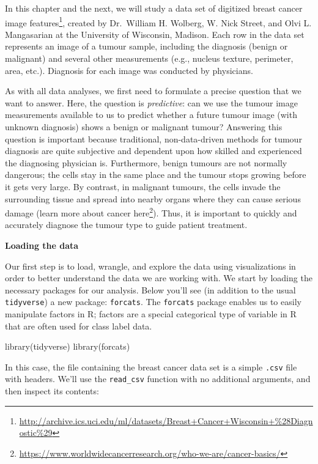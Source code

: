 \documentclass[
]{krantz}
\makeatletter
\newenvironment{Shaded}{\begin{snugshade}}{\end{snugshade}}
\newcommand{\FunctionTok}[1]{\textcolor[rgb]{0,0,0}{#1}}
\newcommand{\NormalTok}[1]{#1}
\renewcommand{\href}[2]{#2\footnote{\url{#1}}}
\newenvironment{kframe}{%
\medskip{}
\setlength{\fboxsep}{.8em}
 \def\at@end@of@kframe{}%
 \ifinner\ifhmode%
  \def\at@end@of@kframe{\end{minipage}}%
  \begin{minipage}{\columnwidth}%
 \fi\fi%
 \def\FrameCommand##1{\hskip\@totalleftmargin \hskip-\fboxsep
 \colorbox{shadecolor}{##1}\hskip-\fboxsep
     \hskip-\linewidth \hskip-\@totalleftmargin \hskip\columnwidth}%
 \MakeFramed {\advance\hsize-\width
   \@totalleftmargin\z@ \linewidth\hsize
   \@setminipage}}%
 {\par\unskip\endMakeFramed%
 \at@end@of@kframe}
\renewenvironment{Shaded}{\begin{kframe}}{\end{kframe}}
\makeatother
\begin{document}
In this chapter and the next, we will study a data set of
\href{http://archive.ics.uci.edu/ml/datasets/Breast+Cancer+Wisconsin+\%28Diagnostic\%29}{digitized breast cancer image features},
created by Dr.~William H. Wolberg, W. Nick Street, and Olvi L. Mangasarian at
the University of Wisconsin, Madison. Each row in the data set represents an
image of a tumour sample, including the diagnosis (benign or malignant) and
several other measurements (e.g., nucleus texture, perimeter, area, etc.).
Diagnosis for each image was conducted by physicians.

As with all data analyses, we first need to formulate a precise question that
we want to answer. Here, the question is \emph{predictive}: can we use the tumour
image measurements available to us to predict whether a future tumour image
(with unknown diagnosis) shows a benign or malignant tumour? Answering this
question is important because traditional, non-data-driven methods for tumour
diagnosis are quite subjective and dependent upon how skilled and experienced
the diagnosing physician is. Furthermore, benign tumours are not normally
dangerous; the cells stay in the same place and the tumour stops growing before
it gets very large. By contrast, in malignant tumours, the cells invade the
surrounding tissue and spread into nearby organs where they can cause serious
damage (\href{https://www.worldwidecancerresearch.org/who-we-are/cancer-basics/}{learn more about cancer here}).
Thus, it is important to quickly and accurately diagnose the tumour type to
guide patient treatment.

\textbf{Loading the data}

Our first step is to load, wrangle, and explore the data using visualizations
in order to better understand the data we are working with. We start by
loading the necessary packages for our analysis. Below you'll see (in addition
to the usual \texttt{tidyverse}) a new package: \texttt{forcats}.
The \texttt{forcats} package enables us to easily
manipulate factors in R; factors are a special categorical type of variable in
R that are often used for class label data.

\begin{Shaded}
\begin{Highlighting}[]
\FunctionTok{library}\NormalTok{(tidyverse)}
\FunctionTok{library}\NormalTok{(forcats)}
\end{Highlighting}
\end{Shaded}

In this case, the file containing the breast cancer data set is a simple \texttt{.csv}
file with headers. We'll use the \texttt{read\_csv} function with no additional
arguments, and then inspect its contents:
\end{document}
